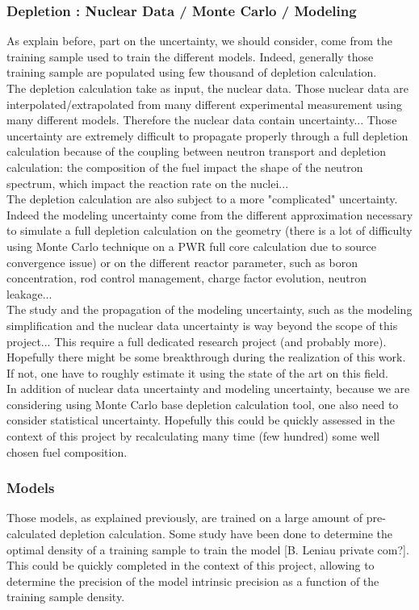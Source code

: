 \documentclass[dvips,12pt]{article}
\begin{document}
\subsubsection{Depletion : Nuclear Data / Monte Carlo / Modeling} %
As explain before, part on the uncertainty, we should consider, come from the training sample used to train the different models. Indeed, generally those training sample are populated using few thousand of depletion calculation.\\
The depletion calculation take as input, the nuclear data. Those nuclear data are interpolated/extrapolated from many different experimental measurement using many different models. Therefore the nuclear data contain uncertainty...
Those uncertainty are extremely difficult to propagate properly through a full depletion calculation because of the coupling between neutron transport and depletion calculation: the composition of the fuel impact the shape of the neutron spectrum, which impact the reaction rate on the nuclei...\\
The depletion calculation are also subject to a more "complicated" uncertainty. Indeed the modeling uncertainty come from the different approximation necessary to simulate a full depletion calculation on the geometry (there is a lot of difficulty using Monte Carlo technique on a PWR full core calculation due to source convergence issue) or on the different reactor parameter, such as boron concentration, rod control management, charge factor evolution, neutron leakage...\\
The study and the propagation of the modeling uncertainty, such as the modeling simplification and the nuclear data uncertainty is way beyond the scope of this project... This require a full dedicated research project (and probably more).  Hopefully there might be some breakthrough during the realization of this work. If not, one have to roughly estimate it using the state of the art on this field. \\
In addition of nuclear data uncertainty and modeling uncertainty, because we are considering using Monte Carlo base depletion calculation tool, one also need to consider statistical uncertainty. Hopefully this could be quickly assessed in the context of this project by recalculating many time (few hundred) some well chosen fuel composition.\\



\subsubsection{Models}
Those models, as explained previously, are trained on a large amount of pre-calculated depletion calculation. Some study have been done to determine the optimal density of a training sample to train the model [B. Leniau private com?]. This could be quickly completed in the context of this project, allowing to determine the precision of the model intrinsic precision as a function of the training sample density.\\
\end{document}
